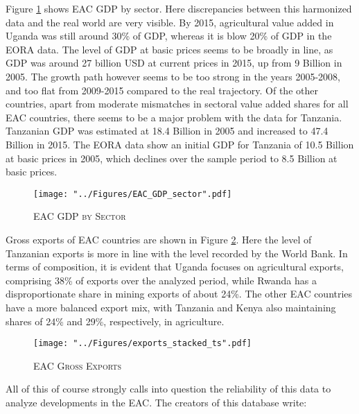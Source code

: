 \documentclass[a4paper]{article}
\begin{document}
Figure \ref{fig:EAC_GDP_sec} shows EAC GDP by sector. Here discrepancies between this harmonized data and the real world are very visible. By 2015, agricultural value added in Uganda was still around 30\% of GDP, whereas it is blow 20\% of GDP in the EORA data. The level of GDP at basic prices seems to be broadly in line, as GDP was around 27 billion USD at current prices in 2015, up from 9 Billion in 2005. The growth path however seems to be too strong in the years 2005-2008, and too flat from 2009-2015 compared to the real trajectory. Of the other countries, apart from moderate mismatches in sectoral value added shares for all EAC countries, there seems to be a major problem with the data for Tanzania. Tanzanian GDP was estimated at 18.4 Billion in 2005 and increased to 47.4 Billion in 2015. The EORA data show an initial GDP for Tanzania of 10.5 Billion at basic prices in 2005, which declines over the sample period to 8.5 Billion at basic prices. \newline



\begin{figure}[h!]
\centering
\caption{\label{fig:EAC_GDP_sec}\textsc{EAC GDP by Sector}}
\texttt{[image: "../Figures/EAC\_GDP\_sector".pdf]} %
\end{figure}
\FloatBarrier

Gross exports of EAC countries are shown in Figure \ref{fig:exp}. Here the level of Tanzanian exports is more in line with the level recorded by the World Bank. In terms of composition, it is evident that Uganda focuses on agricultural exports, comprising 38\% of exports over the analyzed period, while Rwanda has a disproportionate share in mining exports of about 24\%. The other EAC countries have a more balanced export mix, with Tanzania and Kenya also maintaining shares of 24\% and 29\%, respectively, in agriculture. 


\begin{figure}[h!]
\centering
\caption{\label{fig:exp}\textsc{EAC Gross Exports}}
\texttt{[image: "../Figures/exports\_stacked\_ts".pdf]} %
\end{figure}
\FloatBarrier

All of this of course strongly calls into question the reliability of this data to analyze developments in the EAC. The creators of this database write:
\end{document}
